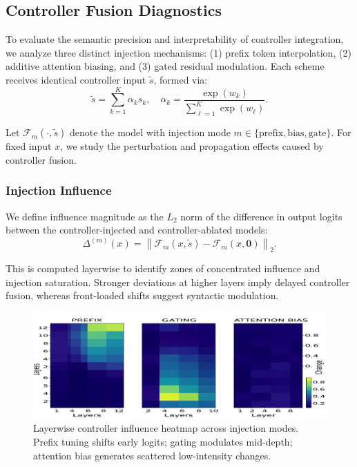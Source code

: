 \subsection{Controller Fusion Diagnostics}
\label{sec:controller-diagnostics}

To evaluate the semantic precision and interpretability of controller integration, we analyze three distinct injection mechanisms: (1) prefix token interpolation, (2) additive attention biasing, and (3) gated residual modulation. Each scheme receives identical controller input \(\tilde{s}\), formed via:
\[
\tilde{s} = \sum_{k=1}^K \alpha_k s_k, \quad \alpha_k = \frac{\exp(w_k)}{\sum_{\ell=1}^K \exp(w_\ell)}.
\]

Let \(\mathcal{F}_m(\cdot, \tilde{s})\) denote the model with injection mode \(m \in \{\mathrm{prefix}, \mathrm{bias}, \mathrm{gate}\}\). For fixed input \(x\), we study the perturbation and propagation effects caused by controller fusion.

\subsubsection*{Injection Influence}

We define influence magnitude as the \(L_2\) norm of the difference in output logits between the controller-injected and controller-ablated models:
\[
\Delta^{(m)}(x) = \left\| \mathcal{F}_m(x, \tilde{s}) - \mathcal{F}_m(x, \mathbf{0}) \right\|_2.
\]

This is computed layerwise to identify zones of concentrated influence and injection saturation. Stronger deviations at higher layers imply delayed controller fusion, whereas front-loaded shifts suggest syntactic modulation.

\begin{figure}[H]
  \centering
  \includegraphics[width=\textwidth]{figures/figure_7.png}
  \caption{Layerwise controller influence heatmap across injection modes. Prefix tuning shifts early logits; gating modulates mid-depth; attention bias generates scattered low-intensity changes.}
  \label{fig:controller_comparison}
\end{figure}

